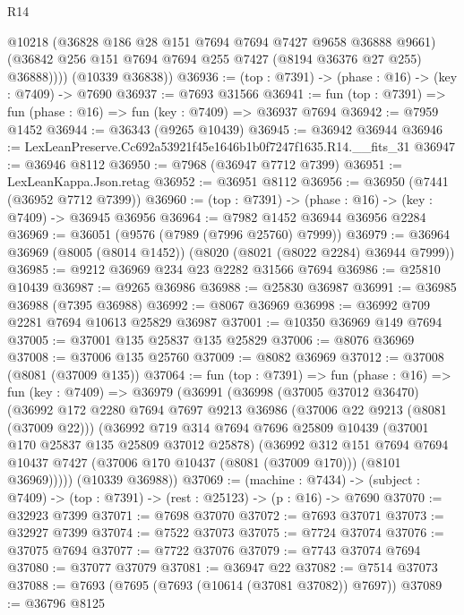 \begin{lexlean}{R14}
\begin{coremodule}
            @10218
            (@36828 @186 @28 @151 @7694 @7694 @7427 @9658 @36888 @9661)
            (@36842 @256 @151 @7694 @7694 @255 @7427 (@8194 @36376 @27 @255) @36888))))
      (@10339 @36838))
@36936 := (top : @7391) -> (phase : @16) -> (key : @7409) -> @7690
@36937 := @7693 @31566
@36941 := fun (top : @7391) => fun (phase : @16) => fun (key : @7409) => @36937 @7694
@36942 := @7959 @1452
@36944 := @36343 (@9265 @10439)
@36945 := @36942 @36944
@36946 := LexLeanPreserve.Cc692a53921f45e1646b1b0f7247f1635.R14.__fits_31
@36947 := @36946 @8112
@36950 := @7968 (@36947 @7712 @7399)
@36951 := LexLeanKappa.Json.retag
@36952 := @36951 @8112
@36956 := @36950 (@7441 (@36952 @7712 @7399))
@36960 := (top : @7391) -> (phase : @16) -> (key : @7409) -> @36945 @36956
@36964 := @7982 @1452 @36944 @36956 @2284
@36969 := @36051 (@9576 (@7989 (@7996 @25760) @7999))
@36979 := @36964 @36969 (@8005 (@8014 @1452)) (@8020 (@8021 (@8022 @2284) @36944 @7999))
@36985 := @9212 @36969 @234 @23 @2282 @31566 @7694
@36986 := @25810 @10439
@36987 := @9265 @36986
@36988 := @25830 @36987
@36991 := @36985 @36988 (@7395 @36988)
@36992 := @8067 @36969
@36998 := @36992 @709 @2281 @7694 @10613 @25829 @36987
@37001 := @10350 @36969 @149 @7694
@37005 := @37001 @135 @25837 @135 @25829
@37006 := @8076 @36969
@37008 := @37006 @135 @25760
@37009 := @8082 @36969
@37012 := @37008 (@8081 (@37009 @135))
@37064 := fun (top : @7391) =>
  fun (phase : @16) =>
  fun (key : @7409) =>
  @36979
    (@36991
      (@36998
        (@37005 @37012 @36470)
        (@36992
          @172
          @2280
          @7694
          @7697
          @9213
          @36986
          (@37006 @22 @9213 (@8081 (@37009 @22)))
          (@36992
            @719
            @314
            @7694
            @7696
            @25809
            @10439
            (@37001 @170 @25837 @135 @25809 @37012 @25878)
            (@36992
              @312
              @151
              @7694
              @7694
              @10437
              @7427
              (@37006 @170 @10437 (@8081 (@37009 @170)))
              (@8101 @36969)))))
      (@10339 @36988))
@37069 := (machine : @7434) ->
  (subject : @7409) -> (top : @7391) -> (rest : @25123) -> (p : @16) -> @7690
@37070 := @32923 @7399
@37071 := @7698 @37070
@37072 := @7693 @37071
@37073 := @32927 @7399
@37074 := @7522 @37073
@37075 := @7724 @37074
@37076 := @37075 @7694
@37077 := @7722 @37076
@37079 := @7743 @37074 @7694
@37080 := @37077 @37079
@37081 := @36947 @22
@37082 := @7514 @37073
@37088 := @7693 (@7695 (@7693 (@10614 (@37081 @37082)) @7697))
@37089 := @36796 @8125

\end{coremodule}
\end{lexlean}
